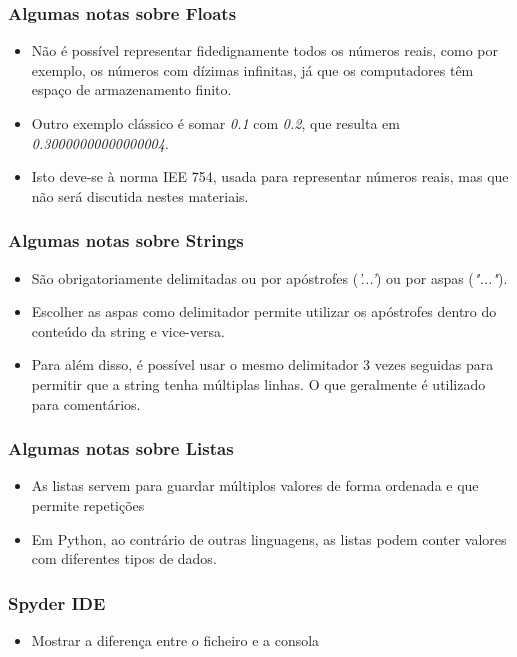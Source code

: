 \documentclass{beamer}
\begin{document}
\begin{frame}
    \frametitle{Algumas notas sobre Floats}
    \begin{itemize}
        \item Não é possível representar fidedignamente todos os números 
        reais, como por exemplo, os números com dízimas infinitas, já que os 
        computadores têm espaço de armazenamento finito.
        \item Outro exemplo clássico é somar \textit{0.1} com \textit{0.2}, que 
        resulta em \textit{0.30000000000000004}.
        \item Isto deve-se à norma IEE 754, usada para representar números reais,
        mas que não será discutida nestes materiais.
    \end{itemize}
\end{frame}

\begin{frame}
    \frametitle{Algumas notas sobre Strings}
    \begin{itemize}
        \item São obrigatoriamente delimitadas ou por apóstrofes (\textit{'...'}) 
            ou por aspas (\textit{"..."}).
        \item Escolher as aspas como delimitador permite utilizar os apóstrofes
            dentro do conteúdo da string e vice-versa.
        \item Para além disso, é possível usar o mesmo delimitador 3 vezes 
            seguidas para permitir que a string tenha múltiplas linhas. O que
            geralmente é utilizado para comentários. 
    \end{itemize}
\end{frame}

\begin{frame}
    \frametitle{Algumas notas sobre Listas}
    \begin{itemize}
        \item As listas servem para guardar múltiplos valores de forma ordenada
        e que permite repetições
        \item Em Python, ao contrário de outras linguagens, as listas podem 
            conter valores com diferentes tipos de dados.
    \end{itemize}
\end{frame}

\begin{frame}
    \frametitle{Spyder IDE}
    \begin{itemize}
        \item Mostrar a diferença entre o ficheiro e a consola
    \end{itemize}
\end{frame}
\end{document}
